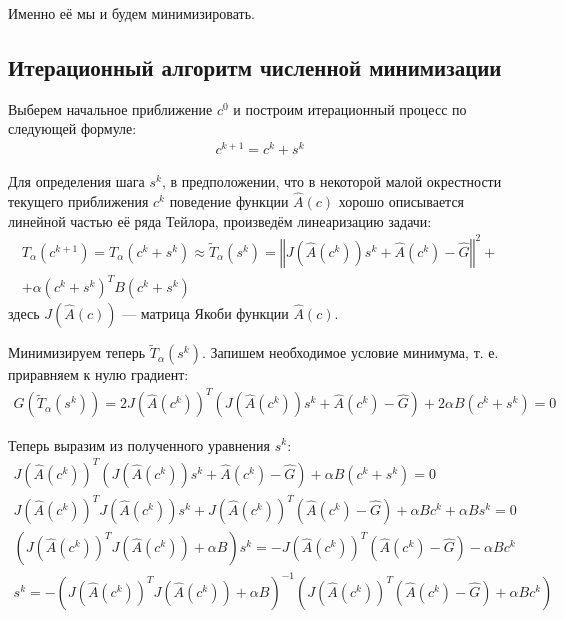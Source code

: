 \documentclass[a4paper,14pt]{extarticle}
\newcommand{\norm}[1]{\left\Vert #1 \right\Vert}
\begin{document}
    Именно её мы и будем минимизировать.

    \subsection{Итерационный алгоритм численной минимизации}

    Выберем начальное приближение $c^0$ и построим итерационный процесс по следующей формуле:
    \begin{gather*}
        c^{k+1} = c^{k} + s^{k}
    \end{gather*}

    Для определения шага $s^k$, в предположении, что в некоторой малой окрестности текущего приближения $c^k$ поведение функции $\hat{A}(c)$ хорошо описывается линейной частью её ряда Тейлора, произведём линеаризацию задачи:
    \begin{gather*}
        T_{\alpha}(c^{k+1})
        = T_{\alpha}(c^{k} + s^{k})
        \approx \widetilde{T}_{\alpha}(s^{k})
        = \norm{J(\hat{A}(c^k))s^{k} + \hat{A}(c^k) - \hat{G}}^2 + \\
        + \alpha  (c^k + s^{k})^{T} B (c^k + s^{k})
    \end{gather*}
    здесь $J(\hat{A}(c))$ --- матрица Якоби функции $\hat{A}(c)$.

    Минимизируем теперь $\widetilde{T}_{\alpha}(s^{k})$. Запишем необходимое условие минимума, т. е. приравняем к нулю градиент:
    \begin{gather*}
        G(\widetilde{T}_{\alpha}(s^{k}))
        = 2 J(\hat{A}(c^k))^T (J(\hat{A}(c^k))s^{k} + \hat{A}(c^k) - \hat{G})
        + 2 \alpha  B (c^k + s^{k})
        = 0
    \end{gather*}

    Теперь выразим из полученного уравнения $s^k$:
    \begin{gather*}
        J(\hat{A}(c^k))^T (J(\hat{A}(c^k))s^{k} + \hat{A}(c^k) - \hat{G})
        + \alpha  B (c^k + s^{k}) = 0 \\
        J(\hat{A}(c^k))^T J(\hat{A}(c^k))s^{k} +
        J(\hat{A}(c^k))^T (\hat{A}(c^k) - \hat{G})
        + \alpha  B c^k +
        \alpha  B s^{k} = 0 \\
        \left(
        J(\hat{A}(c^k))^T J(\hat{A}(c^k))
        + \alpha  B
        \right) s^{k} =
        -J(\hat{A}(c^k))^T (\hat{A}(c^k) - \hat{G})
        - \alpha  B c^k  \\
        s^{k} = -
        \left(
        J(\hat{A}(c^k))^T J(\hat{A}(c^k))
        + \alpha  B
        \right)^{-1}
        \left(
        J(\hat{A}(c^k))^T (\hat{A}(c^k) - \hat{G})
        + \alpha  B c^k
        \right)
    \end{gather*}
\end{document}
